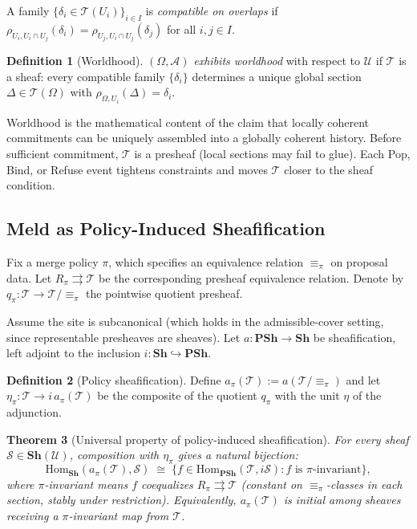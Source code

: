 \documentclass[12pt,a4paper]{article}
\newtheorem{theorem}{Theorem}[section]
\theoremstyle{definition}
\newtheorem{definition}[theorem]{Definition}
\theoremstyle{remark}
\providecommand{\Hom}{\mathrm{Hom}}
\renewcommand{\Hom}{\mathrm{Hom}}
\newcommand{\PSh}{\mathbf{PSh}}
\newcommand{\Sh}{\mathbf{Sh}}
\begin{document}
A family $\{\delta_i\in\mathcal{T}(U_i)\}_{i\in I}$ is \emph{compatible on overlaps}
if $\rho_{U_i,U_i\cap U_j}(\delta_i)=\rho_{U_j,U_i\cap U_j}(\delta_j)$ for all
$i,j\in I$.

\begin{definition}[Worldhood]
\label{def:worldhood}
$(\Omega,\mathcal{A})$ \emph{exhibits worldhood} with respect to $\mathcal{U}$ if
$\mathcal{T}$ is a sheaf: every compatible family $\{\delta_i\}$ determines a unique
global section $\Delta\in\mathcal{T}(\Omega)$ with $\rho_{\Omega,U_i}(\Delta)=\delta_i$.
\end{definition}

Worldhood is the mathematical content of the claim that locally coherent commitments
can be uniquely assembled into a globally coherent history. Before sufficient
commitment, $\mathcal{T}$ is a presheaf (local sections may fail to glue). Each
Pop, Bind, or Refuse event tightens constraints and moves $\mathcal{T}$ closer to the
sheaf condition.

\subsection{Meld as Policy-Induced Sheafification}

Fix a merge policy $\pi$, which specifies an equivalence relation $\equiv_\pi$ on
proposal data. Let $R_\pi\rightrightarrows\mathcal{T}$ be the corresponding presheaf
equivalence relation. Denote by $q_\pi:\mathcal{T}\to\mathcal{T}/{\equiv_\pi}$ the
pointwise quotient presheaf.

Assume the site is subcanonical (which holds in the admissible-cover setting, since
representable presheaves are sheaves). Let $a:\PSh\to\Sh$ be sheafification, left
adjoint to the inclusion $i:\Sh\hookrightarrow\PSh$.

\begin{definition}[Policy sheafification]
\label{def:policy-sheaf}
Define $a_\pi(\mathcal{T}):=a(\mathcal{T}/{\equiv_\pi})$ and let
$\eta_\pi:\mathcal{T}\to i\,a_\pi(\mathcal{T})$ be the composite of the quotient
$q_\pi$ with the unit $\eta$ of the adjunction.
\end{definition}

\begin{theorem}[Universal property of policy-induced sheafification]
\label{thm:sheafification}
For every sheaf $\mathcal{S}\in\Sh(\mathcal{U})$, composition with $\eta_\pi$ gives
a natural bijection:
\[
  \Hom_{\Sh}(a_\pi(\mathcal{T}),\mathcal{S})
  \;\cong\;
  \{f\in\Hom_{\PSh}(\mathcal{T},i\mathcal{S}):f\text{ is }\pi\text{-invariant}\},
\]
where $\pi$-invariant means $f$ coequalizes $R_\pi\rightrightarrows\mathcal{T}$
(constant on $\equiv_\pi$-classes in each section, stably under restriction).
Equivalently, $a_\pi(\mathcal{T})$ is initial among sheaves receiving a $\pi$-invariant
map from $\mathcal{T}$.
\end{theorem}
\end{document}
